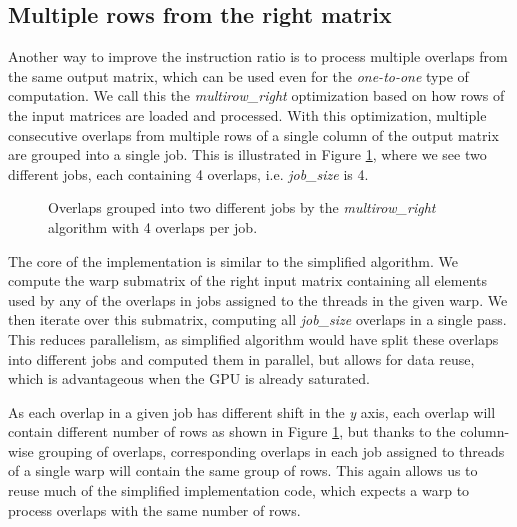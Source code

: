 
\subsection{Multiple rows from the right matrix}
\label{sec:multirow_right}

Another way to improve the instruction ratio is to process multiple overlaps from the same output matrix, which can be used even for the \textit{one-to-one} type of computation. We call this the \textit{multirow\_right} optimization based on how rows of the input matrices are loaded and processed. With this optimization, multiple consecutive overlaps from multiple rows of a single column of the output matrix are grouped into a single job. This is illustrated in Figure \ref{fig:multirow_shifts}, where we see two different jobs, each containing 4 overlaps, i.e. \textit{job\_size} is 4. 

\begin{figure}[ht]
	\centering
	\def\svgwidth{0.5\textwidth}
	\fontsize{6}{8}\selectfont
	
	\caption{Overlaps grouped into two different jobs by the \textit{multirow\_right} algorithm with 4 overlaps per job.}
	\label{fig:multirow_shifts}
\end{figure}

The core of the implementation is similar to the simplified algorithm. We compute the warp submatrix of the right input matrix containing all elements used by any of the overlaps in jobs assigned to the threads in the given warp. We then iterate over this submatrix, computing all \textit{job\_size} overlaps in a single pass. This reduces parallelism, as simplified algorithm would have split these overlaps into different jobs and computed them in parallel, but allows for data reuse, which is advantageous when the GPU is already saturated.

As each overlap in a given job has different shift in the \textit{y} axis, each overlap will contain different number of rows as shown in Figure \ref{fig:multirow_shifts}, but thanks to the column-wise grouping of overlaps, corresponding overlaps in each job assigned to threads of a single warp will contain the same group of rows. This again allows us to reuse much of the simplified implementation code, which expects a warp to process overlaps with the same number of rows.

